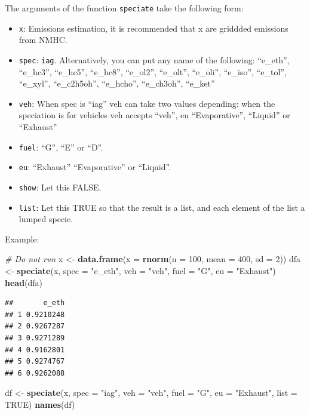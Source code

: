 \documentclass[12pt,graybox,envcountchap,sectrefs]{krantz}
\makeatletter
\newenvironment{Shaded}{\begin{snugshade}}{\end{snugshade}}
\newcommand{\KeywordTok}[1]{\textcolor[rgb]{0.13,0.29,0.53}{\textbf{#1}}}
\newcommand{\DataTypeTok}[1]{\textcolor[rgb]{0.13,0.29,0.53}{#1}}
\newcommand{\DecValTok}[1]{\textcolor[rgb]{0.00,0.00,0.81}{#1}}
\newcommand{\StringTok}[1]{\textcolor[rgb]{0.31,0.60,0.02}{#1}}
\newcommand{\CommentTok}[1]{\textcolor[rgb]{0.56,0.35,0.01}{\textit{#1}}}
\newcommand{\OtherTok}[1]{\textcolor[rgb]{0.56,0.35,0.01}{#1}}
\newcommand{\NormalTok}[1]{#1}
\providecommand{\tightlist}{%
  \setlength{\itemsep}{0pt}\setlength{\parskip}{0pt}}
\newenvironment{kframe}{%
\medskip{}
\setlength{\fboxsep}{.8em}
 \def\at@end@of@kframe{}%
 \ifinner\ifhmode%
  \def\at@end@of@kframe{\end{minipage}}%
  \begin{minipage}{\columnwidth}%
 \fi\fi%
 \def\FrameCommand##1{\hskip\@totalleftmargin \hskip-\fboxsep
 \colorbox{shadecolor}{##1}\hskip-\fboxsep
     \hskip-\linewidth \hskip-\@totalleftmargin \hskip\columnwidth}%
 \MakeFramed {\advance\hsize-\width
   \@totalleftmargin\z@ \linewidth\hsize
   \@setminipage}}%
 {\par\unskip\endMakeFramed%
 \at@end@of@kframe}
\renewenvironment{Shaded}{\begin{kframe}}{\end{kframe}}
\theoremstyle{definition}
\theoremstyle{definition}
\theoremstyle{definition}
\theoremstyle{remark}
\makeatother
\begin{document}
The arguments of the function \texttt{speciate} take the following form:

\begin{itemize}
\tightlist
\item
  \texttt{x}: Emissions estimation, it is recommended that x are
  griddded emissions from NMHC.
\item
  \texttt{spec}: \texttt{iag}. Alternatively, you can put any name of
  the following: ``e\_eth'', ``e\_hc3'', ``e\_hc5'', ``e\_hc8'',
  ``e\_ol2'', ``e\_olt'', ``e\_oli'', ``e\_iso'', ``e\_tol'',
  ``e\_xyl'', ``e\_c2h5oh'', ``e\_hcho'', ``e\_ch3oh'', ``e\_ket''
\item
  \texttt{veh}: When spec is ``iag'' veh can take two values depending:
  when the speciation is for vehicles veh accepts ``veh'', eu
  ``Evaporative'', ``Liquid'' or ``Exhaust''
\item
  \texttt{fuel}: ``G'', ``E'' or ``D''.
\item
  \texttt{eu}: ``Exhaust'' ``Evaporative'' or ``Liquid''.
\item
  \texttt{show}: Let this FALSE.
\item
  \texttt{list}: Let this TRUE so that the result is a list, and each
  element of the list a lumped specie.
\end{itemize}

Example:

\begin{Shaded}
\begin{Highlighting}[]
\CommentTok{# Do not run}
\NormalTok{x <-}\StringTok{ }\KeywordTok{data.frame}\NormalTok{(}\DataTypeTok{x =} \KeywordTok{rnorm}\NormalTok{(}\DataTypeTok{n =} \DecValTok{100}\NormalTok{, }\DataTypeTok{mean =} \DecValTok{400}\NormalTok{, }\DataTypeTok{sd =} \DecValTok{2}\NormalTok{))}
\NormalTok{dfa <-}\StringTok{ }\KeywordTok{speciate}\NormalTok{(x, }\DataTypeTok{spec =} \StringTok{"e_eth"}\NormalTok{, }\DataTypeTok{veh =} \StringTok{"veh"}\NormalTok{, }\DataTypeTok{fuel =} \StringTok{"G"}\NormalTok{, }\DataTypeTok{eu =} \StringTok{"Exhaust"}\NormalTok{)}
\KeywordTok{head}\NormalTok{(dfa)}
\end{Highlighting}
\end{Shaded}

\begin{verbatim}
##       e_eth
## 1 0.9210248
## 2 0.9267287
## 3 0.9271289
## 4 0.9162801
## 5 0.9274767
## 6 0.9262088
\end{verbatim}

\begin{Shaded}
\begin{Highlighting}[]
\NormalTok{df <-}\StringTok{ }\KeywordTok{speciate}\NormalTok{(x, }\DataTypeTok{spec =} \StringTok{"iag"}\NormalTok{, }\DataTypeTok{veh =} \StringTok{"veh"}\NormalTok{, }\DataTypeTok{fuel =} \StringTok{"G"}\NormalTok{,}
               \DataTypeTok{eu =} \StringTok{"Exhaust"}\NormalTok{, }\DataTypeTok{list =} \OtherTok{TRUE}\NormalTok{)}
\KeywordTok{names}\NormalTok{(df)}
\end{Highlighting}
\end{Shaded}
\end{document}
